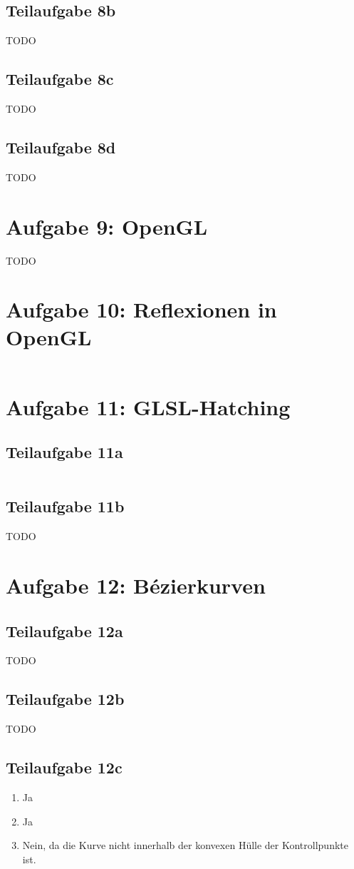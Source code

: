 \documentclass[a4paper]{scrartcl}
\begin{document}
\subsection*{Teilaufgabe 8b}
TODO
\subsection*{Teilaufgabe 8c}
TODO
\subsection*{Teilaufgabe 8d}
TODO

\section*{Aufgabe 9: OpenGL}
TODO

\section*{Aufgabe 10: Reflexionen in OpenGL}
\inputminted[linenos, numbersep=5pt, tabsize=4, frame=lines, label=shader.frag]{glsl}{shader.frag}

\section*{Aufgabe 11: GLSL-Hatching}
\subsection*{Teilaufgabe 11a}
\inputminted[linenos, numbersep=5pt, tabsize=4, frame=lines, label=shader.frag]{glsl}{shader.frag}
\subsection*{Teilaufgabe 11b}
TODO

\section*{Aufgabe 12: Bézierkurven}
\subsection*{Teilaufgabe 12a}
TODO
\subsection*{Teilaufgabe 12b}
TODO
\subsection*{Teilaufgabe 12c}
\begin{enumerate}
    \item Ja
    \item Ja
    \item Nein, da die Kurve nicht innerhalb der konvexen Hülle der
          Kontrollpunkte ist.
\end{enumerate}
\end{document}
